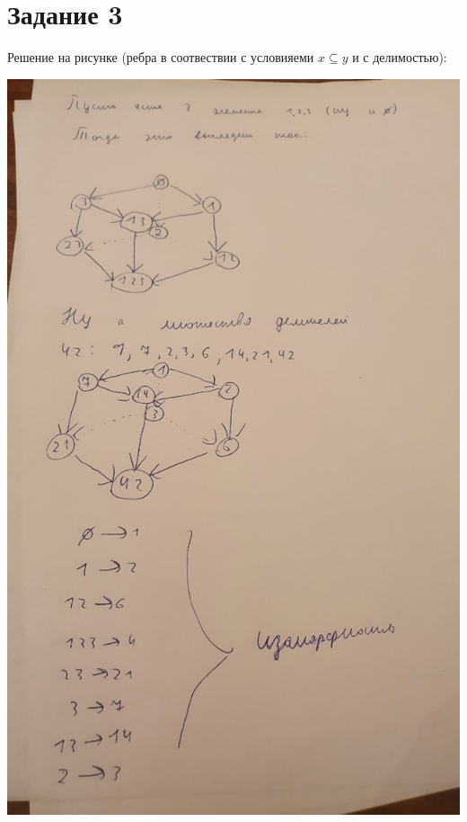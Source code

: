 \documentclass[a4paper,12pt]{article}
\begin{document}
\section*{Задание 3}
Решение на рисунке (ребра в соотвествии с условияеми $x \subseteq y$ и с делимостью):
\begin{center}
\includegraphics[scale=0.4]{7yVZbj5okUA.jpg}
\end{center}
\end{document}
